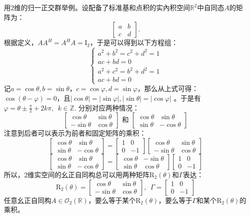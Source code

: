 \documentclass[12pt,UTF8]{ctexbook}
\begin{document}
用$2$维的归一正交群举例。设配备了标准基和点积的实內积空间$\mathbb{R}^2$中自同态$A$的矩阵为：
$$ \begin{bmatrix} a & b \\ c & d \end{bmatrix}. $$
根据定义，$A A^H = A^H A = \mathrm{I}_2$，于是可以得到以下方程组：
$$ \left\{
\begin{array}{l}
    a^2 + b^2 = c^2 + d^2 = 1 \\
    ac + bd = 0 \\
    a^2 + c^2 = b^2 + d^2 = 1 \\
    ac + bd = 0
\end{array} 
\right.
$$
记$a=\cos{\theta}, b = \sin{\theta}$，$c = \cos{\varphi}, d = \sin{\varphi}$，那么从上式可得：$\cos{(\theta - \varphi)} = 0$，且$|\cos{\theta}| = |\sin{\varphi}|, |\sin{\theta}| = |\cos{\varphi}|$ 。于是有$\varphi = \theta \pm \frac{\pi}{2} + 2k\pi, \,\,\, k\in\mathbb{Z}.$ 分别对应两种情况：
$$\begin{bmatrix}\cos{\theta} & \sin{\theta} \\ -\sin{\theta} & \cos{\theta}\end{bmatrix} \mbox{ 和 } \begin{bmatrix}\cos{\theta} & \sin{\theta} \\ \sin{\theta} & -\cos{\theta}\end{bmatrix}$$
注意到后者可以表示为前者和固定矩阵的乘积：
$$\begin{bmatrix}\cos{\theta} & \sin{\theta} \\ \sin{\theta} & -\cos{\theta}\end{bmatrix} =  \begin{bmatrix} 1 &0 \\ 0 & -1\end{bmatrix} \begin{bmatrix}\cos{\theta} & \sin{\theta} \\ -\sin{\theta} & \cos{\theta}\end{bmatrix}$$
$$\begin{bmatrix}\cos{\theta} & \sin{\theta} \\ \sin{\theta} & -\cos{\theta}\end{bmatrix} = \begin{bmatrix}\cos{\theta} & -\sin{\theta} \\ \sin{\theta} & \cos{\theta}\end{bmatrix}\begin{bmatrix} 1 &0 \\ 0 & -1\end{bmatrix}
$$
所以，$2$维实空间的幺正自同构总可以用两种矩阵$\mathrm{R}_2(\theta)$和$\Gamma$表达：
$$\mathrm{R}_2(\theta) = \begin{bmatrix}\cos{\theta} & \sin{\theta} \\ -\sin{\theta} & \cos{\theta}\end{bmatrix}, \,\,\, \Gamma = \begin{bmatrix} 1 &0 \\ 0 & -1\end{bmatrix}$$
任意幺正自同构$A\in\mathcal{O}_2(\mathbb{R})$，要么等于某个$\mathrm{R}_2(\theta)$，要么等于$\Gamma$和某个$\mathrm{R}_2(\theta)$的乘积。
\end{document}
